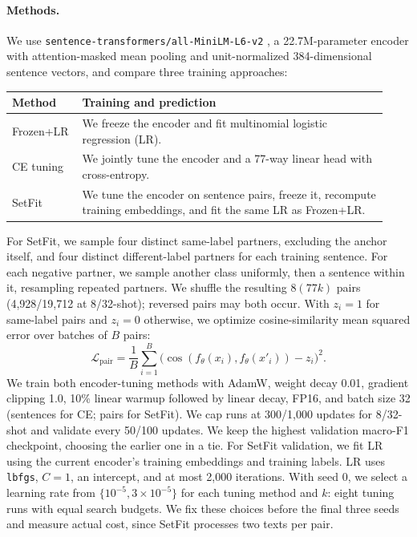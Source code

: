 \documentclass{article}
\begin{document}
\paragraph{Methods.}
We use \texttt{sentence-transformers/all-MiniLM-L6-v2} \cite{minilmhub}, a 22.7M-parameter encoder with attention-masked mean pooling and unit-normalized 384-dimensional sentence vectors, and compare three training approaches:
\begin{center}
\small
\begin{tabular}{@{}p{0.15\linewidth}p{0.78\linewidth}@{}}
\toprule
Method & Training and prediction\\
\midrule
Frozen+LR & We freeze the encoder and fit multinomial logistic regression (LR).\\
CE tuning & We jointly tune the encoder and a 77-way linear head with cross-entropy.\\
SetFit & We tune the encoder on sentence pairs, freeze it, recompute training embeddings, and fit the same LR as Frozen+LR.\\
\bottomrule
\end{tabular}
\end{center}
For SetFit, we sample four distinct same-label partners, excluding the anchor itself, and four distinct different-label partners for each training sentence. For each negative partner, we sample another class uniformly, then a sentence within it, resampling repeated partners. We shuffle the resulting $8(77k)$ pairs (4,928/19,712 at 8/32-shot); reversed pairs may both occur. With $z_i=1$ for same-label pairs and $z_i=0$ otherwise, we optimize cosine-similarity mean squared error over batches of $B$ pairs:
\[
\mathcal L_{\mathrm{pair}}=\frac{1}{B}\sum_{i=1}^{B}\bigl(\cos(f_\theta(x_i),f_\theta(x'_i))-z_i\bigr)^2.
\]
We train both encoder-tuning methods with AdamW, weight decay 0.01, gradient clipping 1.0, 10\% linear warmup followed by linear decay, FP16, and batch size 32 (sentences for CE; pairs for SetFit). We cap runs at 300/1,000 updates for 8/32-shot and validate every 50/100 updates. We keep the highest validation macro-F1 checkpoint, choosing the earlier one in a tie. For SetFit validation, we fit LR using the current encoder's training embeddings and training labels. LR uses \texttt{lbfgs}, $C=1$, an intercept, and at most 2,000 iterations. With seed 0, we select a learning rate from $\{10^{-5},3\!\times\!10^{-5}\}$ for each tuning method and $k$: eight tuning runs with equal search budgets. We fix these choices before the final three seeds and measure actual cost, since SetFit processes two texts per pair.
\end{document}
